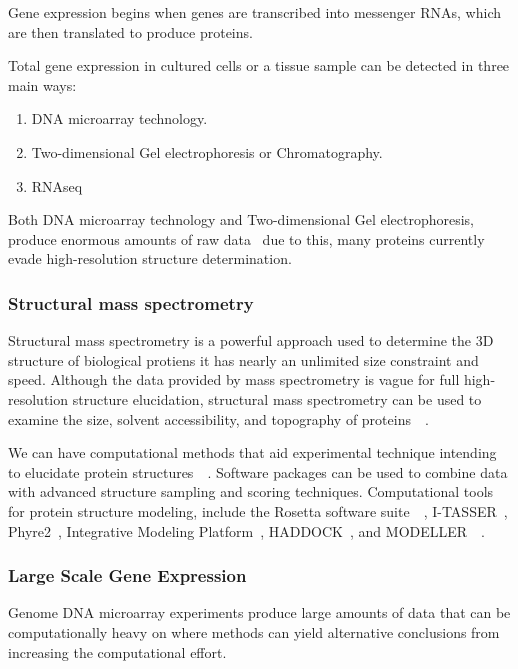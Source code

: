\documentclass[]{final_report}
\begin{document}
Gene expression begins when genes are transcribed into messenger RNAs, which are then translated to produce proteins. 

Total gene expression in cultured cells or a tissue sample can be detected in three main ways:

\begin{enumerate}
    \item DNA microarray technology.
    \item Two-dimensional Gel electrophoresis or Chromatography.
    \item RNAseq
\end{enumerate}

Both DNA microarray technology and Two-dimensional Gel electrophoresis, produce enormous amounts of raw data~\cite{zvelebil_understanding_2008} due to this, many proteins currently evade high-resolution structure determination.


\subsubsection{Structural mass spectrometry}
Structural mass spectrometry is a powerful approach used to determine the 3D structure of biological protiens it has nearly an unlimited size constraint and speed. Although the data provided by mass spectrometry is vague for full high-resolution structure elucidation, structural mass spectrometry can be used to examine the size, solvent accessibility, and topography of proteins~\cite{limpikirati_covalent_2018}~\cite{liu_mass_2020}.

We can have computational methods that aid experimental technique intending to elucidate protein structures~\cite{seffernick_hybrid_2020}~\cite{leman_macromolecular_2020}. Software packages can be used to combine data with advanced structure sampling and scoring techniques. Computational tools for protein structure modeling, include the Rosetta software suite~\cite{leman_macromolecular_2020}~\cite{alford_rosetta_2017}, I-TASSER~\cite{yang_i-tasser_2015}, Phyre2~\cite{kelley_phyre2_2015}, Integrative Modeling Platform~\cite{russel_putting_2012}, HADDOCK~\cite{dominguez_haddock_2003}, and MODELLER~\cite{eswar_comparative_2006}~\cite{biehn_protein_2022}.

\clearpage
\subsubsection{Large Scale Gene Expression}

Genome DNA microarray experiments produce large amounts of data that can be computationally heavy on where methods can yield alternative conclusions from increasing the computational effort.
\end{document}
